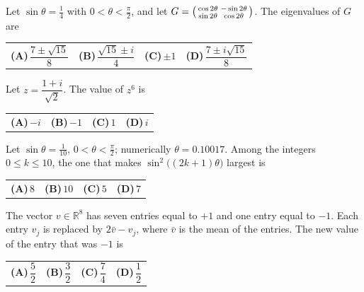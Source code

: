 \documentclass[11pt,a4paper]{article}
\newcommand{\optlabel}[1]{\textbf{(#1)}}
\newenvironment{qitem}[1]{\begin{list}{}{\setlength{\leftmargin}{3.3em}\setlength{\labelwidth}{3.1em}%
  \setlength{\labelsep}{0.2em}\setlength{\topsep}{3pt}\setlength{\parsep}{3pt}}\item[\textbf{Q.#1}\hfill]}{\end{list}}
\newcommand{\qsep}{\par\vspace{2pt}{\color{black!15}\hrule}\vspace{4pt}}
\begin{document}
\begin{qitem}{4}
Let $\sin\theta = \tfrac14$ with $0 < \theta < \tfrac\pi2$, and let
$G = \begin{psmallmatrix}\cos 2\theta & -\sin 2\theta\\ \sin 2\theta & \cos 2\theta\end{psmallmatrix}$. The eigenvalues of $G$ are
\par\smallskip\noindent\begin{tabularx}{\linewidth}{@{}*{4}{L}@{}}
\optlabel{A}\,$\dfrac{7 \pm \sqrt{15}}{8}$ & \optlabel{B}\,$\dfrac{\sqrt{15} \pm i}{4}$ & \optlabel{C}\,$\pm 1$ & \optlabel{D}\,$\dfrac{7 \pm i\sqrt{15}}{8}$
\end{tabularx}
\end{qitem}
\qsep

\begin{qitem}{5}
Let $z = \dfrac{1 + i}{\sqrt2}$. The value of $z^6$ is
\par\smallskip\noindent\begin{tabularx}{\linewidth}{@{}*{4}{L}@{}}
\optlabel{A}\,$-i$ & \optlabel{B}\,$-1$ & \optlabel{C}\,$1$ & \optlabel{D}\,$i$
\end{tabularx}
\end{qitem}
\qsep

\begin{qitem}{6}
Let $\sin\theta = \tfrac{1}{10}$, $0 < \theta < \tfrac\pi2$; numerically $\theta = 0.10017$. Among the integers $0 \le k \le 10$, the one that makes
$\sin^2\big((2k+1)\theta\big)$ largest is
\par\smallskip\noindent\begin{tabularx}{\linewidth}{@{}*{4}{L}@{}}
\optlabel{A}\,$8$ & \optlabel{B}\,$10$ & \optlabel{C}\,$5$ & \optlabel{D}\,$7$
\end{tabularx}
\end{qitem}
\qsep

\begin{qitem}{7}
The vector $v \in \mathbb{R}^{8}$ has seven entries equal to $+1$ and one entry equal to $-1$. Each entry $v_j$ is replaced by $2\bar v - v_j$,
where $\bar v$ is the mean of the entries. The new value of the entry that was $-1$ is
\par\smallskip\noindent\begin{tabularx}{\linewidth}{@{}*{4}{L}@{}}
\optlabel{A}\,$\dfrac52$ & \optlabel{B}\,$\dfrac32$ & \optlabel{C}\,$\dfrac74$ & \optlabel{D}\,$\dfrac12$
\end{tabularx}
\end{qitem}
\qsep
\end{document}

